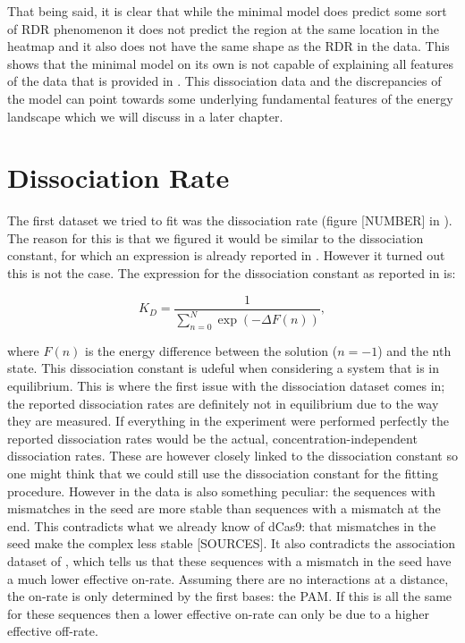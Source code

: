 
That being said, it is clear that while the minimal model does predict some sort of RDR phenomenon it does not predict the region at the same location in the heatmap and it also does not have the same shape as the RDR in the data. This shows that the minimal model on its own is not capable of explaining all features of the data that is provided in \cite{PNAS}. This dissociation data and the discrepancies of the model can point towards some underlying fundamental features of the energy landscape which we will discuss in a later chapter.





\section{Dissociation Rate}


The first dataset we tried to fit was the dissociation rate (figure [NUMBER] in \cite{PNAS}). %
The reason for this is that we figured it would be similar to the dissociation constant, for which an expression is already reported in \cite{Misha}. %
However it turned out this is not the case. The expression for the dissociation constant as reported in \cite{Misha} is: %

\begin{equation}
K_D = \frac{1}{\sum_{n=0}^{N} \exp{(-\Delta F(n))}},
\end{equation}

where $F(n)$ is the energy difference between the solution ($n=-1$) and the nth state. This dissociation constant is udeful when considering a system that is in equilibrium. This is where the first issue with the dissociation dataset comes in; the reported dissociation rates are definitely not in equilibrium due to the way they are measured. If everything in the experiment were performed perfectly the reported dissociation rates would be the actual, concentration-independent dissociation rates. These are however closely linked to the dissociation constant so one might think that we could still use the dissociation constant for the fitting procedure. However in the data is also something peculiar: the sequences with mismatches in the seed are more stable than sequences with a mismatch at the end. This contradicts what we already know of dCas9: that mismatches in the seed make the complex less stable [SOURCES]. It also contradicts the association dataset of \cite{PNAS}, which tells us that these sequences with a mismatch in the seed have a much lower effective on-rate. Assuming there are no interactions at a distance, the on-rate is only determined by the first bases: the PAM. If this is all the same for these sequences then a lower effective on-rate can only be due to a higher effective off-rate.

